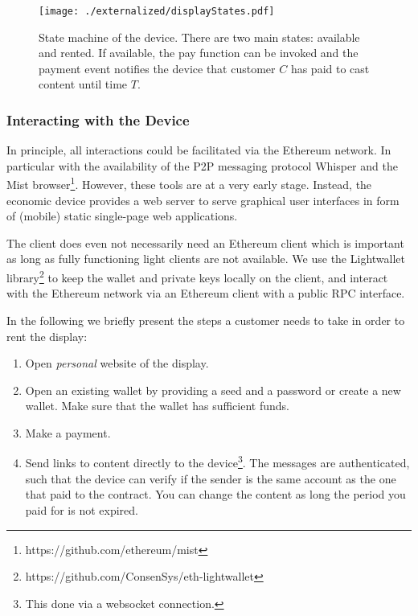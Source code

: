 \begin{figure}
 \centering
 \texttt{[image: ./externalized/displayStates.pdf]}
 \caption{State machine of the device. There are two main states: available and rented. If available, the pay function can be invoked and the payment event notifies the device that customer $C$ has paid to cast content until time $T$.}
 \label{fig:displayStates}
 \end{figure}


\subsubsection{Interacting with the Device}

In principle, all interactions could be facilitated via the Ethereum network. In particular with the availability of the \ac{P2P} messaging protocol Whisper \parencite{whisper} and the Mist browser\footnote{https://github.com/ethereum/mist}. However, these tools are at a very early stage. Instead, the economic device provides a web server to serve graphical user interfaces in form of (mobile) static single-page web applications. 

The client does even not necessarily need an Ethereum client which is important as long as fully functioning light clients are not available. We use the Lightwallet library\footnote{https://github.com/ConsenSys/eth-lightwallet} to keep the wallet and private keys locally on the client, and interact with the Ethereum network via an Ethereum client with a public \ac{RPC} interface.

In the following we briefly present the steps a customer needs to take in order to rent the display: 

\begin{enumerate}
\item Open \emph{personal} website of the display.
\item Open an existing wallet by providing a seed and a password or create a new wallet. Make sure that the wallet has sufficient funds.
\item Make a payment.
\item Send links to content directly to the device\footnote{This done via a websocket\parencite{rfc6455} connection.}. The messages are authenticated, such that the device can verify if the sender is the same account as the one that paid to the contract. You can change the content as long the period you paid for is not expired.
\end{enumerate} 

